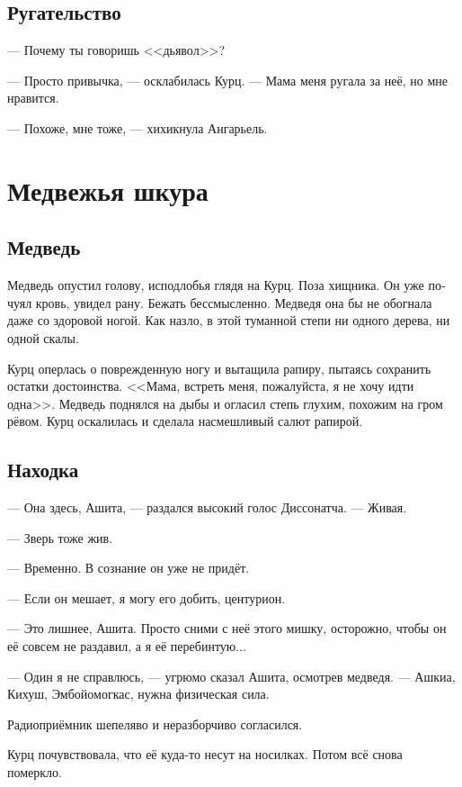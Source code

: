 \documentclass[a4paper,12pt,fleqn]{book}\usepackage{cooltooltips}\usepackage{polyglossia}\setdefaultlanguage[babelshorthands=true]{russian}\setotherlanguage{english}\defaultfontfeatures{Ligatures=TeX,Mapping=tex-text} \usepackage{xcolor}\definecolor{lightgray}{HTML}{bbbbbb}\color{lightgray}\newcommand{\ml}[3]{\textenglish{\textcolor{black}{#3}}}
\begin{document}
\section{Ругательство}

--- Почему ты говоришь <<дьявол>>?

--- Просто привычка, --- осклабилась Курц.
--- Мама меня ругала за неё, но мне нравится.

--- Похоже, мне тоже, --- хихикнула Ангарьель.

\chapter{Медвежья шкура}

\section{Медведь}

Медведь опустил голову, исподлобья глядя на Курц.
Поза хищника.
Он уже почуял кровь, увидел рану.
Бежать бессмысленно.
Медведя она бы не обогнала даже со здоровой ногой.
Как назло, в этой туманной степи ни одного дерева, ни одной скалы.

Курц оперлась о поврежденную ногу и вытащила рапиру, пытаясь сохранить остатки достоинства.
<<Мама, встреть меня, пожалуйста, я не хочу идти одна>>.
Медведь поднялся на дыбы и огласил степь глухим, похожим на гром рёвом.
Курц оскалилась и сделала насмешливый салют рапирой.

\section{Находка}

--- Она здесь, Ашита, --- раздался высокий голос Диссонатча.
--- Живая.

--- Зверь тоже жив.

--- Временно.
В сознание он уже не придёт.

--- Если он мешает, я могу его добить, центурион.

--- Это лишнее, Ашита.
Просто сними с неё этого мишку, осторожно, чтобы он её совсем не раздавил, а я её перебинтую...

--- Один я не справлюсь, --- угрюмо сказал Ашита, осмотрев медведя.
--- Ашкиа, Кихуш, Эмбойомогкас, нужна физическая сила. %

Радиоприёмник шепеляво и неразборчиво согласился.

Курц почувствовала, что её куда-то несут на носилках.
Потом всё снова померкло.
\end{document}
